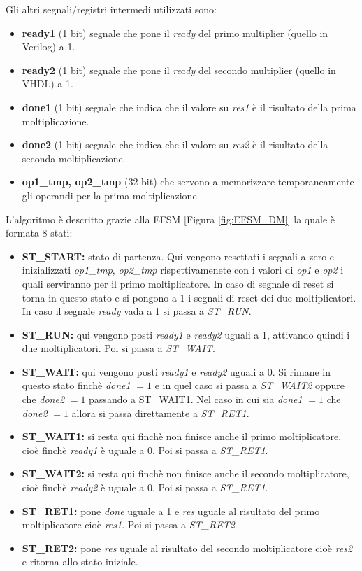 \documentclass[]{IEEEtran}
\begin{document}
Gli altri segnali/registri intermedi utilizzati sono:
\begin{itemize}
    \item \textbf{ready1} (1 bit) segnale che pone il \textit{ready} del primo multiplier (quello in Verilog) a 1.
    \item \textbf{ready2} (1 bit) segnale che pone il \textit{ready} del secondo multiplier (quello in VHDL) a 1.
    \item \textbf{done1} (1 bit) segnale che indica che il valore su \textit{res1} è il risultato della prima moltiplicazione.
    \item \textbf{done2} (1 bit) segnale che indica che il valore su \textit{res2} è il risultato della seconda moltiplicazione.
    \item \textbf{op1\_tmp, op2\_tmp} (32 bit) che servono a memorizzare temporaneamente gli operandi per la prima moltiplicazione.
\end{itemize}

L'algoritmo è descritto grazie alla EFSM [Figura \ref{fig:EFSM_DM}] la quale è formata 8 stati:
\begin{itemize}
    \item \textbf{ST\_START:} stato di partenza. Qui vengono resettati i segnali a zero e inizializzati \textit{op1\_tmp}, \textit{op2\_tmp} rispettivamenete con i valori di \textit{op1} e \textit{op2} i quali serviranno per il primo moltiplicatore. In caso di segnale di reset si torna in questo stato e si pongono a 1 i segnali di reset dei due moltiplicatori. In caso il segnale \textit{ready} vada a 1 si passa a \textit{ST\_RUN}.
    \item \textbf{ST\_RUN:} qui vengono posti \textit{ready1} e \textit{ready2} uguali a 1, attivando quindi i due moltiplicatori. Poi si passa a \textit{ST\_WAIT}.
    \item \textbf{ST\_WAIT:} qui vengono posti \textit{ready1} e \textit{ready2} uguali a 0. Si rimane in questo stato finchè \textit{done1} $=1$ e in quel caso si passa a \textit{ST\_WAIT2} oppure che \textit{done2} $=1$ passando a {ST\_WAIT1}. Nel caso in cui sia \textit{done1} $=1$ che \textit{done2} $=1$ allora si passa direttamente a \textit{ST\_RET1}.
    \item \textbf{ST\_WAIT1:} si resta qui finchè non finisce anche il primo moltiplicatore, cioè finchè \textit{ready1} è uguale a 0. Poi si passa a \textit{ST\_RET1}.
    \item \textbf{ST\_WAIT2:} si resta qui finchè non finisce anche il secondo moltiplicatore, cioè finchè \textit{ready2} è uguale a 0. Poi si passa a \textit{ST\_RET1}.
    \item \textbf{ST\_RET1:} pone \textit{done} uguale a 1 e \textit{res} uguale al risultato del primo moltiplicatore cioè \textit{res1}. Poi si passa a \textit{ST\_RET2}.
    \item \textbf{ST\_RET2:} pone \textit{res} uguale al risultato del secondo moltiplicatore cioè \textit{res2} e ritorna allo stato iniziale.
\end{itemize}
\end{document}
